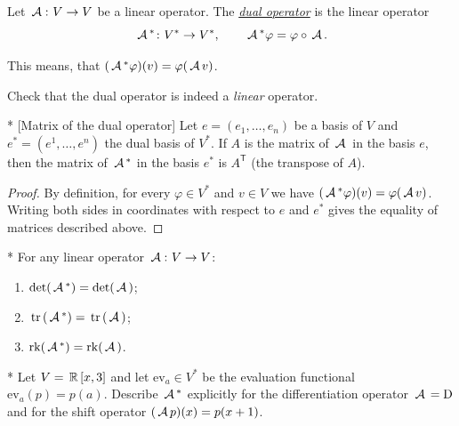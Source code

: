 \begin{definition}
Let $\,\mathcal{A}\,\colon V \to V$ be a linear operator. The \underline{\it dual operator} is the linear operator
$$
\,\mathcal{A}\,^* \colon V^* \to V^*, \qquad \,\mathcal{A}\,^*\varphi = \varphi \circ \,\mathcal{A}\, .
$$
\end{definition}

This means, that $(\,\mathcal{A}\,^*\varphi)(v) = \varphi(\,\mathcal{A}\, v)$.

\begin{exercise}
Check that the dual operator is indeed a {\it linear} operator.
\end{exercise}

\begin{lemma}* [Matrix of the dual operator]
Let $e=(e_1,\dots,e_n)$ be a basis of $V$ and $e^*=(e^1,\dots,e^n)$ the dual basis of $V^*$. If $A$ is the matrix of $\,\mathcal{A}\,$ in the basis $e$, then the matrix of $\,\mathcal{A}\,^*$ in the basis $e^*$ is $A^{\mathsf T}$ (the transpose of $A$).
\end{lemma}

\begin{proof}
By definition, for every $\varphi \in V^*$ and $v \in V$ we have $(\,\mathcal{A}\,^*\varphi)(v) = \varphi(\,\mathcal{A}\, v)$. Writing both sides in coordinates with respect to $e$ and $e^*$ gives the equality of matrices described above.
\end{proof}

\begin{corollary}*
For any linear operator $\,\mathcal{A}\,\colon V \to V$:
\begin{enumerate}[(1)]
    \item $\det(\,\mathcal{A}\,^*) = \det(\,\mathcal{A}\,)$;
    \item $\,\mathrm{tr}\,(\,\mathcal{A}\,^*) = \,\mathrm{tr}\,(\,\mathcal{A}\,)$;
    \item $\operatorname{rk}(\,\mathcal{A}\,^*) = \operatorname{rk}(\,\mathcal{A}\,)$.
\end{enumerate}
\end{corollary}

\begin{exercise}*
Let $V=\,\mathbb{R}\,[x,3]$ and let $\mathrm{ev}_a \in V^*$ be the evaluation functional $\mathrm{ev}_a(p)=p(a)$. Describe $\,\mathcal{A}\,^*$ explicitly for the differentiation operator $\,\mathcal{A}\,=\mathrm{D}$ and for the shift operator $(\,\mathcal{A}\, p)(x)=p(x+1)$.
\end{exercise}


